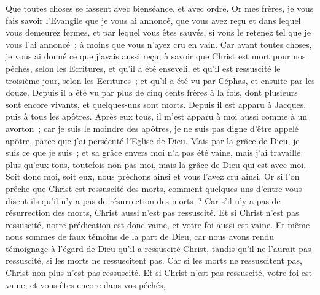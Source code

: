 \begin{multicols}{2}
Que toutes choses se fassent avec bienséance, et avec ordre.
\VerseOne{}Or mes frères, je vous fais savoir l'Evangile que je vous ai annoncé, que vous avez reçu et dans lequel vous demeurez fermes,
et par lequel vous êtes sauvés, si vous le retenez tel que je vous l'ai annoncé~; à moins que vous n'ayez cru en vain. 
Car avant toutes choses, je vous ai donné ce que j'avais aussi reçu, à savoir que Christ est mort pour nos péchés, selon les Ecritures,
et qu'il a été enseveli, et qu'il est ressuscité le troisième jour, selon les Ecritures~;
et qu'il a été vu par Céphas, et ensuite par les douze.
Depuis il a été vu par plus de cinq cents frères à la fois, dont plusieurs sont encore vivants, et quelques-uns sont morts.
Depuis il est apparu à Jacques, puis à tous les apôtres.
Après eux tous, il m'est apparu à moi aussi comme à un avorton~;
car je suis le moindre des apôtres, je ne suis pas digne d'être appelé apôtre, parce que j'ai persécuté l'Eglise de Dieu.
Mais par la grâce de Dieu, je suis ce que je suis~; et sa grâce envers moi n'a pas été vaine, mais j'ai travaillé plus qu'eux tous, toutefois non pas moi, mais la grâce de Dieu qui est avec moi.
Soit donc moi, soit eux, nous prêchons ainsi et vous l'avez cru ainsi.
Or si l'on prêche que Christ est ressuscité des morts, comment quelques-uns d'entre vous disent-ils qu'il n'y a pas de résurrection des morts~?
Car s'il n'y a pas de résurrection des morts, Christ aussi n'est pas ressuscité.
Et si Christ n'est pas ressuscité, notre prédication est donc vaine, et votre foi aussi est vaine.
Et même nous sommes de faux témoins de la part de Dieu, car nous avons rendu témoignage à l'égard de Dieu qu'il a ressuscité Christ, tandis qu'il ne l'aurait pas ressuscité, si les morts ne ressuscitent pas.
Car si les morts ne ressuscitent pas, Christ non plus n'est pas ressuscité.
Et si Christ n'est pas ressuscité, votre foi est vaine, et vous êtes encore dans vos péchés,

\end{multicols}
